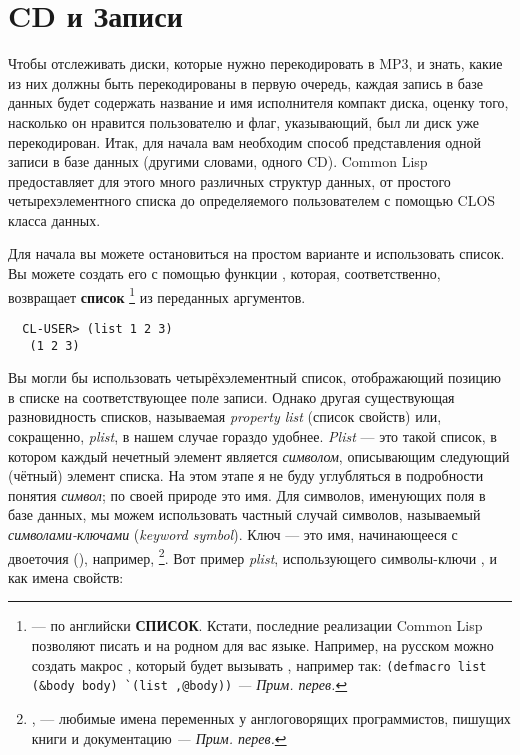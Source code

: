 \section{CD и Записи}

Чтобы отслеживать диски, которые нужно перекодировать в MP3, и знать, какие из них должны
быть перекодированы в первую очередь, каждая запись в базе данных будет содержать название
и имя исполнителя компакт диска, оценку того, насколько он нравится пользователю и флаг,
указывающий, был ли диск уже перекодирован. Итак, для начала вам необходим способ
представления одной записи в базе данных (другими словами, одного CD). Common Lisp
предоставляет для этого много различных структур данных, от простого четырехэлементного
списка до определяемого пользователем с помощью CLOS класса данных.

Для начала вы можете остановиться на простом варианте и использовать список. Вы можете
создать его с помощью функции , которая, соответственно, возвращает
\textbf{список} \footnote{ --- по английски \textbf{СПИСОК}. Кстати, последние
  реализации Common Lisp позволяют писать и на родном для вас языке. Например, на русском
  можно создать макрос , который будет вызывать , например так:
  \lstinline!(defmacro list (&body body) `(list ,@body))! \textit{--- Прим. перев.}} из
переданных аргументов.

\begin{verbatim}
  CL-USER> (list 1 2 3)
   (1 2 3)
\end{verbatim}

Вы могли бы использовать четырёхэлементный список, отображающий позицию в списке на
соответствующее поле записи. Однако другая существующая разновидность списков, называемая
\textit{property list} (список свойств) или, сокращенно, \textit{plist}, в нашем случае
гораздо удобнее. \textit{Plist} --- это такой список, в котором каждый нечетный элемент
является \textit{символом}, описывающим следующий (чётный) элемент списка. На этом этапе я
не буду углубляться в подробности понятия \textit{символ}; по своей природе это имя. Для
символов, именующих поля в базе данных, мы можем использовать частный случай символов,
называемый \textit{символами-ключами} (\textit{keyword symbol}). Ключ --- это имя,
начинающееся с двоеточия (\code{:}), например, \footnote{, 
  --- любимые имена переменных у англоговорящих программистов, пишущих книги и
  документацию \textit{--- Прим. перев.}}. Вот пример \textit{plist}, использующего
символы-ключи ,  и  как имена свойств:

